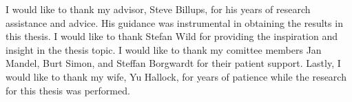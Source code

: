 I would like to thank my advisor, Steve Billups, for his years of research assistance and advice. 
His guidance was instrumental in obtaining the results in this thesis. 
I would like to thank Stefan Wild for providing the inspiration and insight in the thesis topic.
I would like to thank my comittee members Jan Mandel, Burt Simon, and Steffan Borgwardt for their
patient support.
Lastly, I would like to thank my wife, Yu Hallock, for years of patience while the research for this thesis was performed.
